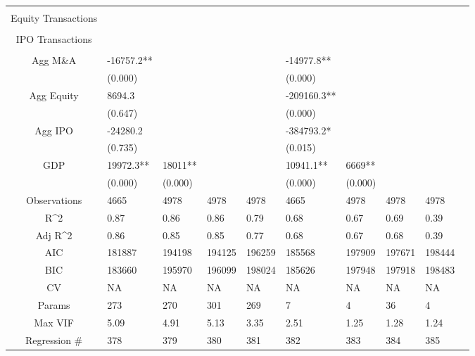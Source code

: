 \documentclass{article}
\begin{document}
\begin{table}[H]
\begin{tabular}{|clllllllll|}
   &  &  &  &  &  &  &  &  & \\ 
  Equity Transactions &  &  &  &  &  &  &  &  & \\ 
   &  &  &  &  &  &  &  &  & \\ 
  IPO Transactions &  &  &  &  &  &  &  &  & \\ 
   &  &  &  &  &  &  &  &  & \\ 
  Agg M\&A & -16757.2** &  &  &  & -14977.8** &  &  &  & \\ 
   & (0.000) &  &  &  & (0.000) &  &  &  & \\ 
  Agg Equity & 8694.3 &  &  &  & -209160.3** &  &  &  & \\ 
   & (0.647) &  &  &  & (0.000) &  &  &  & \\ 
  Agg IPO & -24280.2 &  &  &  & -384793.2* &  &  &  & \\ 
   & (0.735) &  &  &  & (0.015) &  &  &  & \\ 
  GDP & 19972.3** & 18011** &  &  & 10941.1** & 6669** &  &  & \\ 
   & (0.000) & (0.000) &  &  & (0.000) & (0.000) &  &  & \\ 
  \hline 
 Observations & 4665 & 4978 & 4978 & 4978 & 4665 & 4978 & 4978 & 4978 & \\ 
  R^2 & 0.87 & 0.86 & 0.86 & 0.79 & 0.68 & 0.67 & 0.69 & 0.39 & \\ 
  Adj R^2 & 0.86 & 0.85 & 0.85 & 0.77 & 0.68 & 0.67 & 0.68 & 0.39 & \\ 
  AIC & 181887 & 194198 & 194125 & 196259 & 185568 & 197909 & 197671 & 198444 & \\ 
  BIC & 183660 & 195970 & 196099 & 198024 & 185626 & 197948 & 197918 & 198483 & \\ 
  CV & NA & NA & NA & NA & NA & NA & NA & NA & \\ 
  Params & 273 & 270 & 301 & 269 & 7 & 4 & 36 & 4 & \\ 
  Max VIF & 5.09 & 4.91 & 5.13 & 3.35 & 2.51 & 1.25 & 1.28 & 1.24 & \\ 
  Regression \# & 378 & 379 & 380 & 381 & 382 & 383 & 384 & 385 & \\ 
   \hline
\end{tabular}
 
\end{table}
\end{document}
